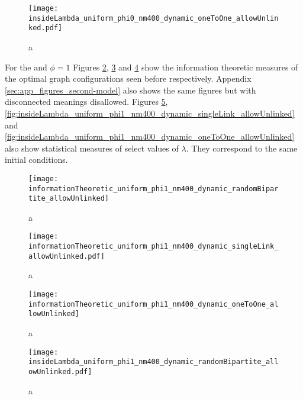 \begin{figure}
  \centering
  \texttt{[image: insideLambda\_uniform\_phi0\_nm400\_dynamic\_oneToOne\_allowUnlinked.pdf]}
  \caption{a}
  \label{fig:insideLambda_uniform_phi0_nm400_dynamic_oneToOne_allowUnlinked}
\end{figure}

For the \secondmodel{} and $\phi=1$ Figures \ref{fig:informationTheoretic_uniform_phi1_nm400_dynamic_randomBipartite_allowUnlinked},  \ref{fig:informationTheoretic_uniform_phi1_nm400_dynamic_singleLink_allowUnlinked} and \ref{fig:informationTheoretic_uniform_phi1_nm400_dynamic_oneToOne_allowUnlinked} show the information theoretic measures of the optimal graph configurations seen before respectively.
Appendix \ref{sec:app_figures_second-model} also shows the same figures but with disconnected meanings disallowed.
Figures \ref{fig:insideLambda_uniform_phi1_nm400_dynamic_randomBipartite_allowUnlinked}, \ref{fig:insideLambda_uniform_phi1_nm400_dynamic_singleLink_allowUnlinked} and \ref{fig:insideLambda_uniform_phi1_nm400_dynamic_oneToOne_allowUnlinked} also show statistical measures of select values of $\lambda$.
They correspond to the same initial conditions.

\begin{figure}
  \centering
  \texttt{[image: informationTheoretic\_uniform\_phi1\_nm400\_dynamic\_randomBipartite\_allowUnlinked]}
  \caption{a}
  \label{fig:informationTheoretic_uniform_phi1_nm400_dynamic_randomBipartite_allowUnlinked}
\end{figure}

\begin{figure}
  \centering
  \texttt{[image: informationTheoretic\_uniform\_phi1\_nm400\_dynamic\_singleLink\_allowUnlinked.pdf]}
  \caption{a}
  \label{fig:informationTheoretic_uniform_phi1_nm400_dynamic_singleLink_allowUnlinked}
\end{figure}

\begin{figure}
  \centering
  \texttt{[image: informationTheoretic\_uniform\_phi1\_nm400\_dynamic\_oneToOne\_allowUnlinked]}
  \caption{a}
  \label{fig:informationTheoretic_uniform_phi1_nm400_dynamic_oneToOne_allowUnlinked}
\end{figure}

\begin{figure}
  \centering
  \texttt{[image: insideLambda\_uniform\_phi1\_nm400\_dynamic\_randomBipartite\_allowUnlinked.pdf]}
  \caption{a}
  \label{fig:insideLambda_uniform_phi1_nm400_dynamic_randomBipartite_allowUnlinked}
\end{figure}

